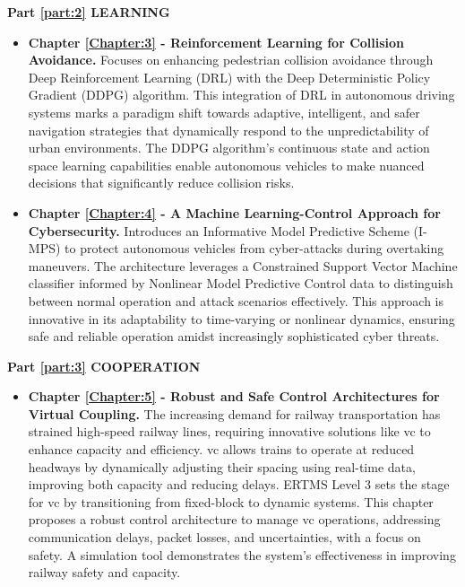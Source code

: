 \textbf{Part \textcolor{red}{\ref{part:2}} LEARNING} 
\begin{itemize}
	\item \textbf{Chapter \textcolor{red}{\ref{Chapter:3}} - Reinforcement Learning for Collision Avoidance. \newline}
	Focuses on enhancing pedestrian collision avoidance through Deep Reinforcement Learning (DRL) with the Deep Deterministic Policy Gradient (DDPG) algorithm. This integration of DRL in autonomous driving systems marks a paradigm shift towards adaptive, intelligent, and safer navigation strategies that dynamically respond to the unpredictability of urban environments. The DDPG algorithm's continuous state and action space learning capabilities enable autonomous vehicles to make nuanced decisions that significantly reduce collision risks.
	\item \textbf{Chapter \textcolor{red}{\ref{Chapter:4}} - A Machine Learning-Control Approach for Cybersecurity. \newline } 
	Introduces an Informative Model Predictive Scheme (I-MPS) to protect autonomous vehicles from cyber-attacks during overtaking maneuvers. The architecture leverages a Constrained Support Vector Machine classifier informed by Nonlinear Model Predictive Control data to distinguish between normal operation and attack scenarios effectively. This approach is innovative in its adaptability to time-varying or nonlinear dynamics, ensuring safe and reliable operation amidst increasingly sophisticated cyber threats.
\end{itemize}
 \textbf{Part \textcolor{red}{\ref{part:3}} COOPERATION}
\begin{itemize}
	\item \textbf{Chapter \textcolor{red}{\ref{Chapter:5}} - Robust and Safe Control Architectures for Virtual Coupling. \newline }
	The increasing demand for railway transportation has strained high-speed railway lines, requiring innovative solutions like \gls{vc} to enhance capacity and efficiency. \gls{vc} allows trains to operate at reduced headways by dynamically adjusting their spacing using real-time data, improving both capacity and reducing delays. ERTMS Level 3 sets the stage for \gls{vc} by transitioning from fixed-block to dynamic systems. This chapter proposes a robust control architecture to manage \gls{vc} operations, addressing communication delays, packet losses, and uncertainties, with a focus on safety. A simulation tool demonstrates the system's effectiveness in improving railway safety and capacity.

\end{itemize}
